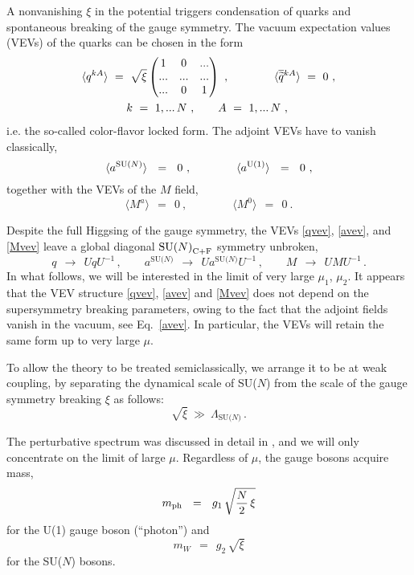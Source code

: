 \documentclass[12pt]{article}
\def\beq{\begin{equation}}
\def\eeq{\end{equation}}
\newcommand{\wt}{\widetilde}
\newcommand{\ov}{\overline}
\newcommand{\LN}{\Lambda_\text{SU($N$)}}
\def\cfl {$\text{SU($N$)}_{\rm C+F}$ }
\newcommand{\aU}{a^{\rm U(1)}}
\newcommand{\aN}{a^\text{SU($N$)}}
\begin{document}
	A nonvanishing $ \xi $ in the potential triggers condensation of quarks and spontaneous breaking 
	of the gauge symmetry. 
	The vacuum expectation values (VEVs) of the quarks can be chosen in the form
\begin{align}
%
\notag
&
	\langle q^{kA} \rangle ~=~ \sqrt{\xi} 
		\begin{pmatrix}
			 1  &   0  &  ... \\
			... &  ... &  ... \\
			... &   0  &  1 
		\end{pmatrix} ~,
	\qquad\qquad 
	\langle \ov{\wt{q}}{}^{kA} \rangle ~=~ 0~,
	\\
%
\label{qvev}
&
	\qquad\qquad  k~=~ 1,...\, N~, \qquad  A ~=~ 1,...\, N~,
\end{align}
i.e.	the so-called color-flavor locked form.
	The adjoint VEVs have to vanish classically,
\beq
\label{avev}
	\langle \aN \rangle  ~~=~~ 0~, \qquad\qquad  \langle \aU \rangle ~~=~~ 0~,
\eeq
	together with the VEVs of the $ M $ field,
\beq
\label{Mvev}
	\langle M^a \rangle ~~=~~ 0~, \qquad\qquad  \langle M^0 \rangle ~~=~~ 0~.
\eeq

	Despite the full Higgsing of the gauge symmetry, the VEVs \eqref{qvev},
	\eqref{avev}, and \eqref{Mvev} leave a global diagonal \cfl symmetry unbroken,
\beq
\label{c+f}
	q ~~\to~~ UqU^{-1}\,, \qquad \aN ~~\to~~ U \aN U^{-1}\,, \qquad
		M ~~\to~~ UMU^{-1}\,.
\eeq
	In what follows, we will be interested in the limit of very large $ \mu_1 $, $ \mu_2 $.
	It appears that the VEV structure \eqref{qvev}, \eqref{avev} and \eqref{Mvev} does not
	depend on the supersymmetry breaking parameters, owing to the fact that 
	the adjoint fields vanish in the vacuum, see Eq.~\eqref{avev}.
	In particular, the VEVs will retain the same form up to very large $ \mu $. 

	To allow the theory to be treated semiclassically, we arrange it to be at weak
	coupling, by separating the dynamical scale of SU($N$) from the scale of the gauge
	symmetry breaking $ \xi $ as follows:
\[
 \sqrt{\xi} ~\gg~ \LN \,.
\]

	The perturbative spectrum was discussed in detail in \cite{GSYmmodel}, and we will only
	concentrate on the limit of large $ \mu $. 
	Regardless of $ \mu $, the gauge bosons acquire mass,
\beq
\label{phmass}
	m_{\rm ph} ~~=~~ g_1\, \sqrt{\frac{N}{2}\,\xi}
\eeq
	for the U(1) gauge boson (``photon'') and
\beq
\label{wmass}
	m_W ~~=~~ g_2\, \sqrt{\xi}
\eeq
	for the SU($N$) bosons.
\end{document}
